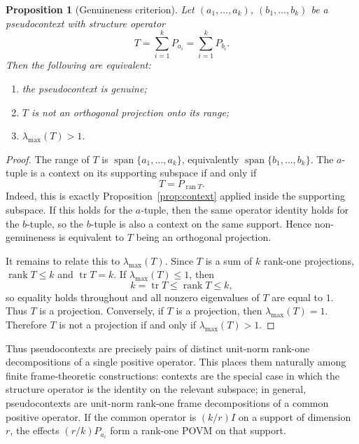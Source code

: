 \documentclass[
  twocolumn,
  aps,
  pra,
  floatfix,
  amsmath,amssymb,
  longbibliography
]{revtex4-2}
\newtheorem{proposition}[theorem]{Proposition}
\theoremstyle{definition}
\theoremstyle{remark}
\begin{document}
\begin{proposition}[Genuineness criterion]
Let \((a_1,\ldots,a_k)\), \((b_1,\ldots,b_k)\) be a pseudocontext with structure operator
\[
T=\sum_{i=1}^k P_{a_i}=\sum_{i=1}^k P_{b_i}.
\]
Then the following are equivalent:
\begin{enumerate}
\item the pseudocontext is genuine;
\item \(T\) is not an orthogonal projection onto its range;
\item \(\lambda_{\max}(T)>1\).
\end{enumerate}
\end{proposition}

\begin{proof}
The range of \(T\) is \(\operatorname{span}\{a_1,\ldots,a_k\}\), equivalently \(\operatorname{span}\{b_1,\ldots,b_k\}\). The \(a\)-tuple is a context on its supporting subspace if and only if
\[
T=P_{\operatorname{ran}T}.
\]
Indeed, this is exactly Proposition~\ref{prop:context} applied inside the supporting subspace. If this holds for the \(a\)-tuple, then the same operator identity holds for the \(b\)-tuple, so the \(b\)-tuple is also a context on the same support. Hence non-genuineness is equivalent to \(T\) being an orthogonal projection.

It remains to relate this to \(\lambda_{\max}(T)\). Since \(T\) is a sum of \(k\) rank-one projections, \(\operatorname{rank}T\le k\) and \(\operatorname{tr}T=k\). If \(\lambda_{\max}(T)\le 1\), then
\[
k=\operatorname{tr}T\le \operatorname{rank}T\le k,
\]
so equality holds throughout and all nonzero eigenvalues of \(T\) are equal to \(1\). Thus \(T\) is a projection. Conversely, if \(T\) is a projection, then \(\lambda_{\max}(T)=1\). Therefore \(T\) is not a projection if and only if \(\lambda_{\max}(T)>1\).
\end{proof}

Thus pseudocontexts are precisely pairs of distinct unit-norm rank-one
decompositions of a single positive operator.  This places them
naturally among finite frame-theoretic constructions: contexts are the
special case in which the structure operator is the identity on the
relevant subspace; in general, pseudocontexts are unit-norm rank-one
frame decompositions of a common positive operator.  If the common
operator is $(k/r)I$ on a support of dimension $r$, the effects
$(r/k)P_{a_i}$ form a rank-one POVM on that support.


\end{document}
